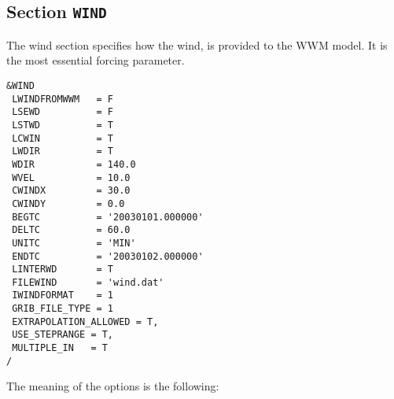 \documentclass[12pt]{amsart}
\begin{document}
\subsection{Section {\tt WIND}}
The wind section specifies how the wind, is provided to the WWM model. It is the most essential forcing parameter.
\begin{verbatim}
&WIND
 LWINDFROMWWM   = F      
 LSEWD          = F      
 LSTWD          = T      
 LCWIN          = T      
 LWDIR          = T      
 WDIR           = 140.0  
 WVEL           = 10.0   
 CWINDX         = 30.0   
 CWINDY         = 0.0    
 BEGTC          = '20030101.000000'
 DELTC          = 60.0             
 UNITC          = 'MIN'            
 ENDTC          = '20030102.000000'
 LINTERWD       = T                
 FILEWIND       = 'wind.dat'       
 IWINDFORMAT    = 1                
 GRIB_FILE_TYPE = 1
 EXTRAPOLATION_ALLOWED = T,
 USE_STEPRANGE = T,
 MULTIPLE_IN   = T 
/
\end{verbatim}
The meaning of the options is the following:
\end{document}
